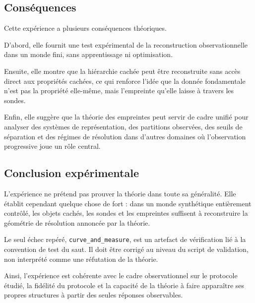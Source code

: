 \documentclass[11pt,a4paper,openany]{book}
\begin{document}
\subsection{Conséquences}

Cette expérience a plusieurs conséquences théoriques.

D'abord, elle fournit une test expérimental de la reconstruction observationnelle dans un monde fini, sans apprentissage ni optimisation.

Ensuite, elle montre que la hiérarchie cachée peut être reconstruite sans accès direct aux propriétés cachées, ce qui renforce l'idée que la donnée fondamentale n'est pas la propriété elle-même, mais l'empreinte qu'elle laisse à travers les sondes.

Enfin, elle suggère que la théorie des empreintes peut servir de cadre unifié pour analyser des systèmes de représentation, des partitions observées, des seuils de séparation et des régimes de résolution dans d'autres domaines où l'observation progressive joue un rôle central.

\subsection{Conclusion expérimentale}

L'expérience ne prétend pas prouver la théorie dans toute sa généralité. Elle établit cependant quelque chose de fort : dans un monde synthétique entièrement contrôlé, les objets cachés, les sondes et les empreintes suffisent à reconstruire la géométrie de résolution annoncée par la théorie.

Le seul échec repéré, \texttt{curve\_and\_measure}, est un artefact de vérification lié à la convention de test du saut. Il doit être corrigé au niveau du script de validation, non interprété comme une réfutation de la théorie.

Ainsi, l'expérience est cohérente avec le cadre observationnel sur le protocole étudié, la fidélité du protocole et la capacité de la théorie à faire apparaître ses propres structures à partir des seules réponses observables.


%















%
\end{document}
